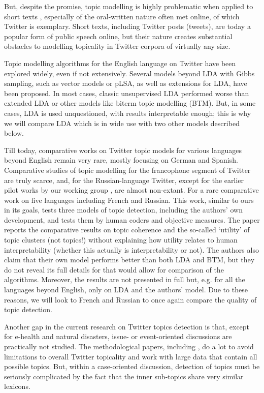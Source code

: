 But, despite the promise, topic modelling is highly problematic when applied to short texts \cite{MazaruraDeWaalKanifer}, especially of the oral-written nature \cite{Lutovinova} often met online, of which Twitter is exemplary. Short texts, including Twitter posts (tweets), are today a popular form of public speech online, but their nature creates substantial obstacles to modelling topicality in Twitter corpora of virtually any size.

Topic modelling algorithms for the English language on Twitter have been explored widely, even if not extensively. Several models beyond LDA with Gibbs sampling, such as vector models or pLSA, as well as extensions for LDA, have been proposed. In most cases, classic unsupervised LDA performed worse than extended LDA or other models like biterm topic modelling (BTM). But, in some cases, LDA is used unquestioned, with results interpretable enough; this is why we will compare LDA which is in wide use with two other models described below.

Till today, comparative works on Twitter topic models for various languages beyond English remain very rare, mostly focusing on German and Spanish. Comparative studies of topic modelling for the francophone segment of Twitter are truly scarce, and, for the Russian-language Twitter, except for the earlier pilot works by our working group \cite{RamageDumaisLiebling,BlekanovTarasovMaksimov,SmoliarovaBodrunovaYakunin}, are almost non-extant. For a rare comparative work on five languages including French and Russian. This work, similar to ours in its goals, tests three models of topic detection, including the authors’ own development, and tests them by human coders and objective measures. The paper reports the comparative results on topic coherence and the so-called ‘utility’ of topic clusters (not topics!) without explaining how utility relates to human interpretability (whether this actually is interpretability or not). The authors also claim that their own model performs better than both LDA and BTM, but they do not reveal its full details for that would allow for comparison of the algorithms. Moreover, the results are not presented in full but, e.g. for all the languages beyond English, only on LDA and the authors’ model. Due to these reasons, we will look to French and Russian to once again compare the quality of topic detection.

Another gap in the current research on Twitter topics detection is that, except for e-health and natural disasters, issue- or event-oriented discussions are practically not studied. The methodological papers, including \cite{Sridhar}, do a lot to avoid limitations to overall Twitter topicality and work with large data that contain all possible topics. But, within a case-oriented discussion, detection of topics must be seriously complicated by the fact that the inner sub-topics share very similar lexicons.

